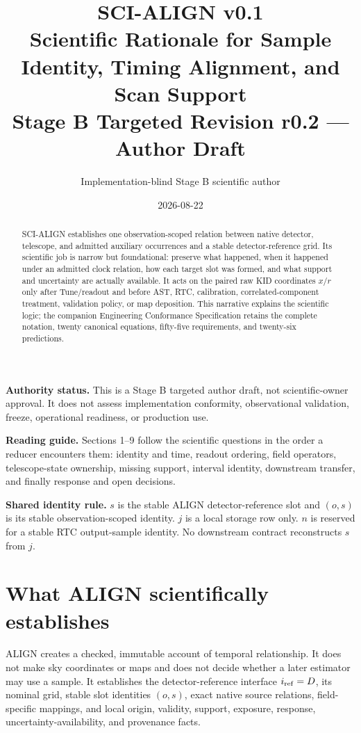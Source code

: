 \documentclass[10pt]{article}
\title{SCI-ALIGN v0.1\\
\large Scientific Rationale for Sample Identity, Timing Alignment, and Scan Support\\[0.3em]
\normalsize Stage B Targeted Revision r0.2 --- Author Draft}
\author{Implementation-blind Stage B scientific author}
\date{2026-08-22}
\newcommand{\statusbox}[1]{\par\smallskip\noindent\colorbox{aligngray}{\parbox{0.96\linewidth}{#1}}\par\smallskip}
\begin{document}
\maketitle

\begin{abstract}
SCI-ALIGN establishes one observation-scoped relation between native detector,
telescope, and admitted auxiliary occurrences and a stable detector-reference
grid.  Its scientific job is narrow but foundational: preserve what happened,
when it happened under an admitted clock relation, how each target slot was
formed, and what support and uncertainty are actually available.  It acts on
the paired raw KID coordinates \(x/r\) only after Tune/readout and before AST,
RTC, calibration, correlated-component treatment, validation policy, or map
deposition.  This narrative explains the scientific logic; the companion
Engineering Conformance Specification retains the complete notation, twenty
canonical equations, fifty-five requirements, and twenty-six predictions.
\end{abstract}

\statusbox{\textbf{Authority status.} This is a Stage B targeted author draft,
not scientific-owner approval.  It does not assess implementation conformity,
observational validation, freeze, operational readiness, or production use.}

\noindent\textbf{Reading guide.} Sections 1--9 follow the scientific questions
in the order a reducer encounters them: identity and time, readout ordering,
field operators, telescope-state ownership, missing support, interval
identity, downstream transfer, and finally response and open decisions.

\vfill
\noindent\textbf{Shared identity rule.} \(s\) is the stable ALIGN
detector-reference slot and \((o,s)\) is its stable observation-scoped
identity.  \(j\) is a local storage row only.  \(n\) is reserved for a stable
RTC output-sample identity.  No downstream contract reconstructs \(s\) from
\(j\).

\clearpage
\section{What ALIGN scientifically establishes}

ALIGN creates a checked, immutable account of temporal relationship.  It does
not make sky coordinates or maps and does not decide whether a later estimator
may use a sample.  It establishes the detector-reference interface
\(i_{\rm ref}=D\), its nominal grid, stable slot identities \((o,s)\), exact
native source relations, field-specific mappings, and local origin, validity,
support, exposure, response, uncertainty-availability, and provenance facts.
\end{document}
